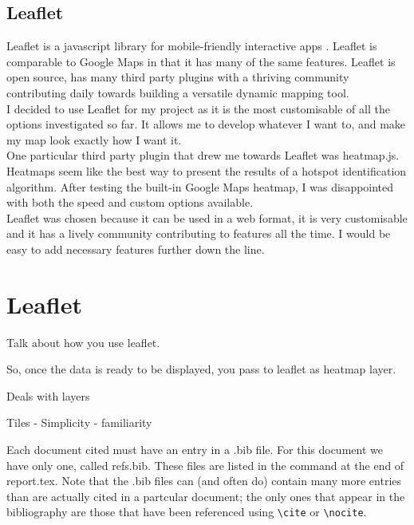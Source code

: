\subsection{Leaflet}

Leaflet is a javascript library for mobile-friendly interactive apps \cite{leaflet}. Leaflet is comparable to Google Maps in that it has many of the same features. Leaflet is open source, has many third party plugins with a thriving community contributing daily towards building a versatile dynamic mapping tool.\\

I decided to use Leaflet for my project as it is the most customisable of all the options investigated so far. It allows me to develop whatever I want to, and make my map look exactly how I want it.\\

One particular third party plugin that drew me towards Leaflet was heatmap.js. Heatmaps seem like the best way to present the results of a hotspot identification algorithm. After testing the built-in Google Maps heatmap, I was disappointed with both the speed and custom options available.\\

Leaflet was chosen because it can be used in a web format, it is very customisable and it has a lively community contributing to features all the time. I would be easy to add necessary features further down the line.

\section{Leaflet}

Talk about how you use leaflet.

So, once the data is ready to be displayed, you pass to leaflet as heatmap layer.

Deals with layers

Tiles - Simplicity - familiarity



Each document cited must have an entry in a \textsf{.bib} file. For this
document we have only one, called \textsf{refs.bib}. These files are
listed in the \verb== command at the end of
\textsf{report.tex}. Note that the \textsf{.bib} files can (and often
do) contain many more entries than are actually cited in a partcular
document; the only ones that appear in the bibliography are those that
have been referenced using \verb=\cite= or \verb=\nocite=.

